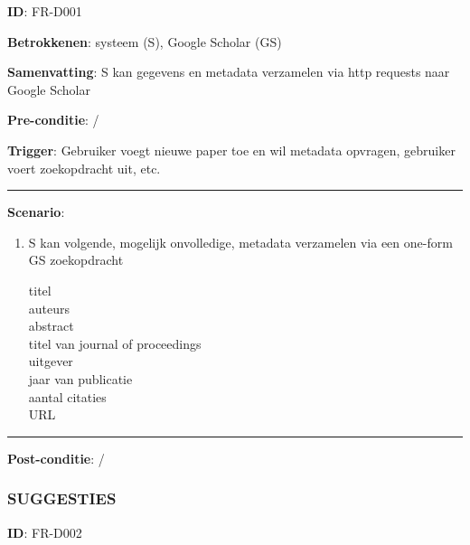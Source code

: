 \textbf{ID}: FR-D001
\vspace{2 mm}

\noindent \textbf{Betrokkenen}: systeem (S), Google Scholar (GS)
\vspace{2 mm}

\noindent \textbf{Samenvatting}: S kan gegevens en metadata verzamelen via http requests naar Google Scholar  
\vspace{2 mm}

\noindent \textbf{Pre-conditie}: /
\vspace{2 mm}

\noindent \textbf{Trigger}: Gebruiker voegt nieuwe paper toe en wil metadata opvragen, gebruiker voert zoekopdracht uit, etc.
\vspace{4 mm}

\hrule
\vspace{2 mm}
\noindent \textbf{Scenario}:
\begin{enumerate}
\item S kan volgende, mogelijk onvolledige, metadata verzamelen via een one-form GS zoekopdracht 
\begin{description}
  \item[titel]  \hfill
  \item[auteurs] \hfill 
   \item[abstract] \hfill
   \item[titel van journal of proceedings ] \hfill 
    \item[uitgever] \hfill 
   \item[jaar van publicatie] \hfill 
    \item[aantal citaties] \hfill
   \item[URL] \hfill 
  \end{description}
\end{enumerate}

\vspace{2 mm}
\hrule
\vspace{4 mm}


\noindent \textbf{Post-conditie}: / \\



\subsubsection{SUGGESTIES}
\vspace{2 mm}

\textbf{ID}: FR-D002
\vspace{2 mm}

